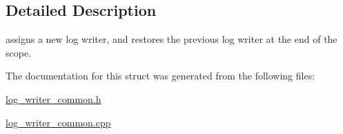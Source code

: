 \subsection{Detailed Description}
assigns a new log writer, and restores the previous log writer at the end of the scope. 

The documentation for this struct was generated from the following files\-:\begin{DoxyCompactItemize}
\item 
\hyperlink{log__writer__common_8h}{log\-\_\-writer\-\_\-common.\-h}\item 
\hyperlink{log__writer__common_8cpp}{log\-\_\-writer\-\_\-common.\-cpp}\end{DoxyCompactItemize}
